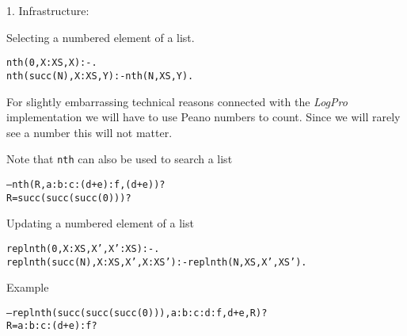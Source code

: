 \documentclass{popl}
\newenvironment{smalltt}{\begin{alltt}\smaller}{\end{alltt}}
\def\LogPro{{\ttfamily\slshape LogPro}\xspace}
\begin{document}
\begin{foil} 
1. Infrastructure: 

Selecting a numbered element of a list.
\begin{smalltt}
    nth(0,       X:XS, X) :- .
    nth(succ(N), X:XS, Y) :- nth(N, XS, Y).
\end{smalltt}
\begin{note}
For slightly embarrassing technical reasons connected with the \LogPro implementation
we will have to use Peano numbers to count. 
Since we will rarely see a number this will not matter.  
\end{note}

Note that {\tt nth} can also be used to search a list
\begin{smalltt}
    -- nth(R, a:b:c:(d+e):f, (d+e))?
    R = succ(succ(succ(0))) ?
\end{smalltt}

Updating a numbered element of a list
\begin{smalltt}
    replnth(0,       X:XS, X', X':XS) :- .
    replnth(succ(N), X:XS, X', X:XS') :- replnth(N, XS, X', XS').
\end{smalltt}

Example        
\begin{smalltt}
    -- replnth(succ(succ(succ(0))), a:b:c:d:f, d+e, R)?
    R = a:b:c:(d+e):f ? 
\end{smalltt}

\end{foil}
\end{document}
